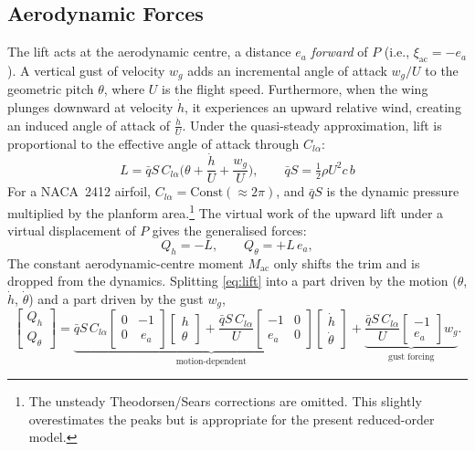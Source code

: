 \documentclass[
	a4paper, %
	10pt, %
]{CSUniSchoolLabReport}
\begin{document}
\subsection{Aerodynamic Forces}
The lift acts at the aerodynamic centre, a distance \(e_a\) \emph{forward} of \(P\)
(i.e., \(\xi_{\mathrm{ac}}=-e_a\)). A vertical gust of velocity \(w_g\) adds an incremental
angle of attack \(w_g/U\) to the geometric pitch \(\theta\), where \(U\) is the flight speed.
Furthermore, when the wing plunges downward at velocity \(\dot{h}\), it experiences an upward relative wind,
creating an induced angle of attack of \(\frac{\dot{h}}{U}\). Under the quasi-steady approximation, lift is proportional to the effective angle
of attack through \(C_{l\alpha}\):
\begin{equation}
    L = \bar{q} S\, C_{l\alpha}\Big(\theta +\frac{\dot{h}}{U} + \frac{w_g}{U}\Big),
    \qquad \bar{q} S = \tfrac{1}{2}\rho U^2 c\, b
    \label{eq:lift}
\end{equation}
For a NACA~2412 airfoil, \(C_{l\alpha} = \text{Const} (\approx 2\pi)\), and \(\bar{q} S\) is the dynamic
pressure multiplied by the planform area.\footnote{The unsteady Theodorsen/Sears
    corrections are omitted. This slightly overestimates the
    peaks but is appropriate for the present reduced-order model.}
The virtual work of the upward lift
under a virtual displacement of \(P\) gives the generalised forces:
\begin{equation}
    Q_h=-L,\qquad Q_\theta=+L\,e_a ,
    \label{eq:Q}
\end{equation}
The constant aerodynamic-centre moment \(M_{\mathrm{ac}}\) only shifts the trim and is dropped
from the dynamics. Splitting \eqref{eq:lift} into a part driven by the motion (\(\theta\), \(\dot{h}\), \(\dot{\theta}\)) and a
part driven by the gust \(w_g\),
\begin{equation}
    \begin{bmatrix}Q_h\\ Q_\theta\end{bmatrix}
    =\underbrace{\bar{q} S\,C_{l\alpha}\begin{bmatrix}0&-1\\0&\ e_a\end{bmatrix}
    \begin{bmatrix}h\\ \theta\end{bmatrix}
    +\frac{\bar{q} S\,C_{l\alpha}}{U} \begin{bmatrix} -1 & 0 \\ e_a & 0 \end{bmatrix} \begin{bmatrix} \dot{h} \\ \dot{\theta} \end{bmatrix}}_{\text{motion-dependent}}
    +\underbrace{\frac{\bar{q} S\,C_{l\alpha}}{U}\begin{bmatrix}-1\\ e_a\end{bmatrix}w_g}_{\text{gust forcing}} .
\end{equation}
\end{document}
